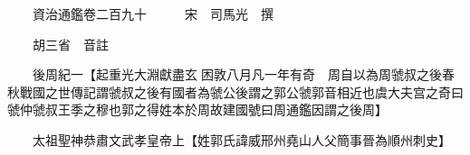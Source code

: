










 


 
 


 

  
  
  
  
  





  
  
  
  
  
 
  

  

  
  
  



  

 
 

  
   




  

  
  


  　　資治通鑑卷二百九十　　　宋　司馬光　撰

　　胡三省　音註

　　後周紀一【起重光大淵獻盡玄困敦八月凡一年有奇　周自以為周虢叔之後春秋戰國之世傳記謂虢叔之後有國者為虢公後謂之郭公虢郭音相近也虞大夫宫之奇曰虢仲虢叔王季之穆也郭之得姓本於周故建國號曰周通鑑因謂之後周】

　　太祖聖神恭肅文武孝皇帝上【姓郭氏諱威邢州堯山人父簡事晉為順州刺史】

